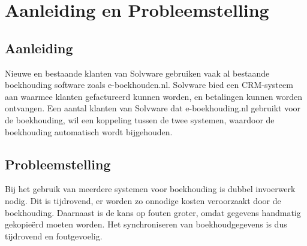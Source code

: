 \chapter{Aanleiding en Probleemstelling}

\section{Aanleiding}
Nieuwe en bestaande klanten van Solvware gebruiken vaak al bestaande boekhouding software zoals e-boekhouden.nl.
Solvware bied een CRM-systeem aan waarmee klanten gefactureerd kunnen worden, en betalingen kunnen worden ontvangen.
Een aantal klanten van Solvware dat e-boekhouding.nl gebruikt voor de boekhouding, wil een koppeling tussen de twee systemen, waardoor de boekhouding automatisch wordt bijgehouden.

\section{Probleemstelling}
Bij het gebruik van meerdere systemen voor boekhouding is dubbel invoerwerk nodig.
Dit is tijdrovend, er worden zo onnodige kosten veroorzaakt door de boekhouding.
Daarnaast is de kans op fouten groter, omdat gegevens handmatig gekopieërd moeten worden.
Het synchroniseren van boekhoudgegevens is dus tijdrovend en foutgevoelig.

